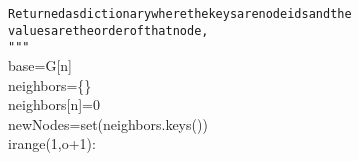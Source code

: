 {{\begin{tabbing}
{\texttt{\hspace{48pt}Returned\hspace{6pt}as\hspace{6pt}dictionary\hspace{6pt}where\hspace{6pt}the\hspace{6pt}keys\hspace{6pt}are\hspace{6pt}node\hspace{6pt}ids\hspace{6pt}and\hspace{6pt}the}}\\
{\texttt{\hspace{48pt}values\hspace{6pt}are\hspace{6pt}the\hspace{6pt}order\hspace{6pt}of\hspace{6pt}that\hspace{6pt}node,}}\\
{\texttt{\hspace{24pt}\string"}}{\texttt{\string"\string"}}\\
\hspace{24pt}base\hspace{6pt}=\hspace{6pt}G{[}n{]}\\
\hspace{24pt}neighbors\hspace{6pt}=\hspace{6pt}\{\}\\
\hspace{24pt}neighbors{[}n{]}\hspace{6pt}=\hspace{6pt}0\\
\hspace{24pt}newNodes\hspace{6pt}=\hspace{6pt}set(neighbors.keys())\\
\hspace{6pt}i\hspace{6pt}range(1,o+1):\\
\\

\end{tabbing}}}
